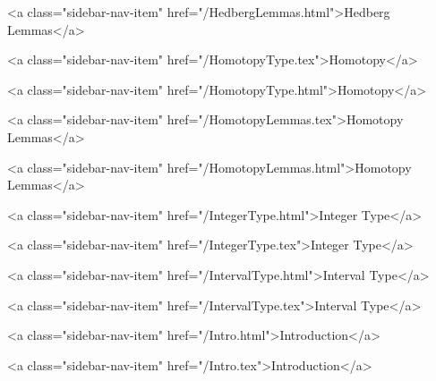       
    
      
        
          <a class="sidebar-nav-item" href="/HedbergLemmas.html">Hedberg Lemmas</a>
        
      
    
      
        
          <a class="sidebar-nav-item" href="/HomotopyType.tex">Homotopy</a>
        
      
    
      
        
          <a class="sidebar-nav-item" href="/HomotopyType.html">Homotopy</a>
        
      
    
      
        
          <a class="sidebar-nav-item" href="/HomotopyLemmas.tex">Homotopy Lemmas</a>
        
      
    
      
        
          <a class="sidebar-nav-item" href="/HomotopyLemmas.html">Homotopy Lemmas</a>
        
      
    
      
        
          <a class="sidebar-nav-item" href="/IntegerType.html">Integer Type</a>
        
      
    
      
        
          <a class="sidebar-nav-item" href="/IntegerType.tex">Integer Type</a>
        
      
    
      
        
          <a class="sidebar-nav-item" href="/IntervalType.html">Interval Type</a>
        
      
    
      
        
          <a class="sidebar-nav-item" href="/IntervalType.tex">Interval Type</a>
        
      
    
      
        
          <a class="sidebar-nav-item" href="/Intro.html">Introduction</a>
        
      
    
      
        
          <a class="sidebar-nav-item" href="/Intro.tex">Introduction</a>
        
